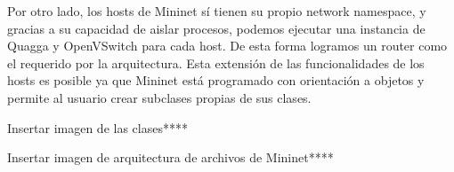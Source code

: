 Por otro lado, los hosts de Mininet sí tienen su propio network namespace, y gracias a su capacidad de aislar procesos, podemos ejecutar una instancia de Quagga y OpenVSwitch para cada host. De esta forma logramos un router como el requerido por la arquitectura. Esta extensión de las funcionalidades de los hosts es posible ya que Mininet está programado con orientación a objetos y permite al usuario crear subclases propias de sus clases.

Insertar imagen de las clases****

Insertar imagen de arquitectura de archivos de Mininet****